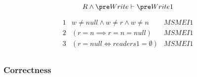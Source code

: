 \documentclass{article}
\begin{document}

\[R \land \pre Write \vdash \pre Write1\]

\begin{displaymath}
\begin{array}{lll}
1 & w\neq null \land w\neq r \land w\neq n & MSMEI1 \\
2 & (r=n \implies r=n=null) & MSMEI1 \\
3 & (r=null \iff readers1=\emptyset) & MSMEI1\\
\end{array}
\end{displaymath}

\subsubsection*{Correctness}

\end{document}
